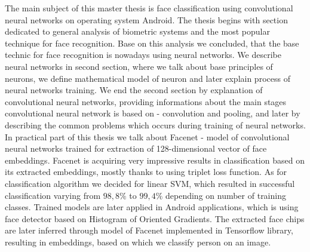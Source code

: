 The main subject of this master thesis is face classification using convolutional neural networks on operating system Android.
The thesis begins with section dedicated to general analysis of biometric systems and the most popular technique for face recognition.
Base on this analysis we concluded, that the base technic for face recognition is nowadays using neural networks.
We describe neural networks in second section, where we talk about base principles of neurons, we define mathematical model of neuron and later explain process of neural networks training.
We end the second section by explanation of convolutional neural networks, providing informations about the main stages convolutional neural network is based on - convolution and pooling, and later by describing the common problems which occurs during training of neural networks.
In practical part of this thesis we talk about Facenet - model of convolutional neural networks trained for extraction of 128-dimensional vector of face embeddings.
Facenet is acquiring very impressive results in classification based on its extracted embeddings, mostly thanks to using triplet loss function.
As for classification algorithm we decided for linear SVM, which resulted in successful classification varying from $ 98,8\% $ to $ 99,4\% $ depending on number of training classes.
Trained models are later applied in Android applications, which is using face detector based on Histogram of Oriented Gradients.
The extracted face chips are later inferred through model of Facenet implemented in Tensorflow library, resulting in embeddings, based on which we classify person on an image.